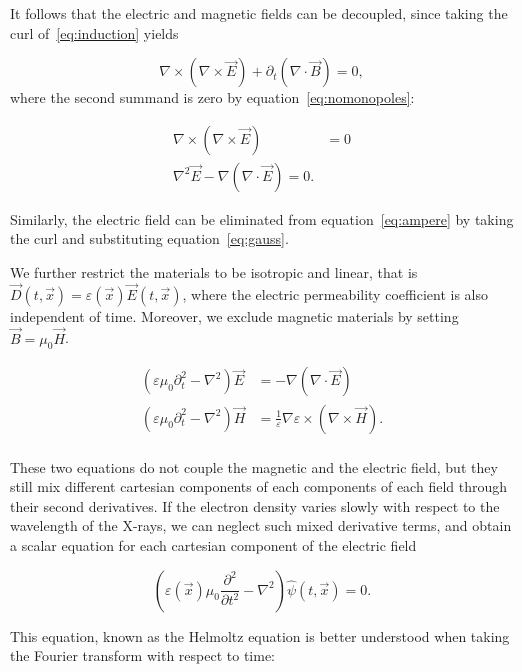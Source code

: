 It follows that the electric and magnetic fields can be decoupled, since
taking the curl of~\eqref{eq:induction} yields

\begin{equation}
    \nabla \times (\nabla \times \vec{E}) + \partial_t(\nabla \cdot \vec{B}) = 0,
    \label{}
\end{equation}
where the second summand is zero by equation~\eqref{eq:nomonopoles}:

\begin{align}
    \nabla \times (\nabla \times \vec{E}) &= 0\\
    \nabla^2 \vec{E} - \nabla (\nabla \cdot \vec{E}) = 0.
    \label{}
\end{align}

Similarly, the electric field can be eliminated from
equation~\eqref{eq:ampere} by taking the curl and substituting
equation~\eqref{eq:gauss}.

We further restrict the materials to be isotropic and linear, that is
$\vec{D}(t, \vec{x}) = \varepsilon(\vec{x}) \vec{E}(t, \vec{x})$, where the
electric permeability coefficient is also independent of time. Moreover, we
exclude magnetic materials by setting $\vec{B} = \mu_0 \vec{H}$.

\begin{align*}
    \left(\varepsilon \mu_0 \partial^2_t - \nabla^2 \right)
    \vec{E} &= - \nabla(\nabla \cdot \vec{E}) \\
    \left(\varepsilon \mu_0 \partial^2_t - \nabla^2 \right)
    \vec{H} &= \frac{1}{\varepsilon}\nabla \varepsilon \times (\nabla \times
    \vec{H}).\\
\end{align*}

These two equations do not couple the magnetic and the electric field, but
they still mix different cartesian components of each components of each
field through their second derivatives. If the electron density varies slowly
with respect to the wavelength of the X-rays, we can neglect such mixed
derivative terms, and obtain a scalar equation for each cartesian component
of the electric field

\begin{equation}
    \left( \varepsilon(\vec{x}) \mu_0 \frac{\partial^2}{\partial t^2} - \nabla^2
    \right) \hat{\psi}(t, \vec{x}) = 0.\label{eq:helmoltz.spacetime}
\end{equation}

This equation, known as the Helmoltz equation is better understood when
taking the Fourier transform with respect to time:

